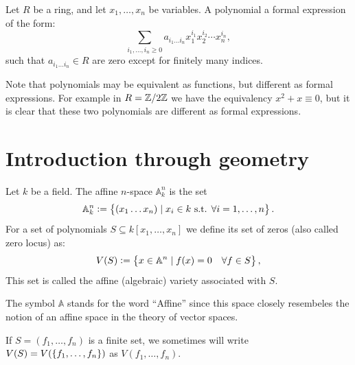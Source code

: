 \documentclass[11pt,a4paper]{article}
\newcommand{\A}{\mathbb A}
\begin{document}
\begin{example}
  Let $R$ be a ring, and let $x_1,\dots,x_n$ be variables.
  A polynomial a formal expression of the form:
  \[
    \sum_{i_1,\dots,i_n \geq 0}
      a_{i_1 \dots i_n} x_1^{i_1} x_2^{i_2} \cdots x_n^{i_n},
  \]
  such that $a_{i_1 \dots i_n} \in R$ are zero except for finitely many indices.
\end{example}

\begin{example}
  Note that polynomials may be equivalent as functions,
  but different as formal expressions.
  For example in $R = \mathbb{Z}/2\mathbb{Z}$
  we have the equivalency $x^2 + x \equiv 0$,
  but it is clear that these two polynomials
  are different as formal expressions.
\end{example}

\newpage
\section{Introduction through geometry}

\begin{definition}
  Let $k$ be a field.
  The affine $n$-space $\A^n_k$ is the set
  \[
    \A^n_k := \set{(x_1 \dots x_n) \mid x_i \in k \st \forall i=1,\dots,n}.
  \]
  For a set of polynomials $S \subseteq k[x_1,\dots,x_n]$ we define
  its set of zeros (also called zero locus) as:
  \[
    V(S) := \set{x \in \A^n \mid f(x) = 0 \quad \forall f \in S},
  \]
  This set is called the affine (algebraic) variety associated with $S$.
\end{definition}

\begin{remark}
  The symbol $\A$ stands for the word ``Affine'' since this space
  closely resembeles the notion of an affine space in the theory of vector
  spaces.
\end{remark}

\begin{remark}
  If $S = (f_1,\dots,f_n)$ is a finite set,
  we sometimes will write $V(S) = V(\left\{f_1,\dots,f_n\right\})$ as $V(f_1,\dots,f_n)$.
\end{remark}
\end{document}
